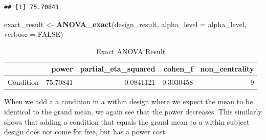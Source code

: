 \documentclass[]{book}
\newenvironment{Shaded}{\begin{snugshade}}{\end{snugshade}}
\newcommand{\CommentTok}[1]{\textcolor[rgb]{0.56,0.35,0.01}{\textit{#1}}}
\newcommand{\DataTypeTok}[1]{\textcolor[rgb]{0.13,0.29,0.53}{#1}}
\newcommand{\DecValTok}[1]{\textcolor[rgb]{0.00,0.00,0.81}{#1}}
\newcommand{\FloatTok}[1]{\textcolor[rgb]{0.00,0.00,0.81}{#1}}
\newcommand{\KeywordTok}[1]{\textcolor[rgb]{0.13,0.29,0.53}{\textbf{#1}}}
\newcommand{\NormalTok}[1]{#1}
\newcommand{\OperatorTok}[1]{\textcolor[rgb]{0.81,0.36,0.00}{\textbf{#1}}}
\newcommand{\OtherTok}[1]{\textcolor[rgb]{0.56,0.35,0.01}{#1}}
\newcommand{\StringTok}[1]{\textcolor[rgb]{0.31,0.60,0.02}{#1}}
\begin{document}
\begin{verbatim}
## [1] 75.70841
\end{verbatim}

\begin{Shaded}
\begin{Highlighting}[]
\NormalTok{exact_result <-}\StringTok{ }\KeywordTok{ANOVA_exact}\NormalTok{(design_result,}
                            \DataTypeTok{alpha_level =}\NormalTok{ alpha_level,}
                            \DataTypeTok{verbose =} \OtherTok{FALSE}\NormalTok{)}
\end{Highlighting}
\end{Shaded}

\begin{table}[!h]

\caption{\label{tab:unnamed-chunk-291}Exact ANOVA Result}
\centering
\begin{tabular}{l|r|r|r|r}
\hline
  & power & partial\_eta\_squared & cohen\_f & non\_centrality\\
\hline
Condition & 75.70841 & 0.0841121 & 0.3030458 & 9\\
\hline
\end{tabular}
\end{table}

When we add a a condition in a within design where we expect the mean to be identical to the grand mean, we again see that the power decreases. This similarly shows that adding a condition that equals the grand mean to a within subject design does not come for free, but has a power cost.

\begin{Shaded}
\end{Shaded}
\end{document}
